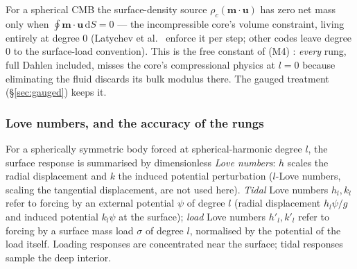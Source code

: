 \documentclass[11pt]{article}
\numberwithin{equation}{section}
\theoremstyle{remark}
\newcommand{\dS}{\,\mathrm{d}S}
\newcommand{\vu}{\mathbf{u}}
\newcommand{\vm}{\mathbf{m}}
\begin{document}
For a spherical CMB the surface-density source $\rho_c(\vm\cdot\vu)$ has
zero net mass only when $\oint\vm\cdot\vu\dS = 0$ --- the incompressible
core's volume constraint, living entirely at degree 0 (Latychev et al.\
\cite{Latychev2005} enforce it per step; other codes leave degree 0 to the
surface-load convention). This is the free constant of (M4) \cite{AW10}:
\emph{every} rung, full Dahlen included, misses the core's compressional
physics at $l=0$ because eliminating the fluid discards its bulk modulus
there. The gauged treatment (\S\ref{sec:gauged}) keeps it.

\subsubsection{Love numbers, and the accuracy of the rungs}

For a spherically symmetric body forced at spherical-harmonic degree $l$,
the surface response is summarised by dimensionless \emph{Love numbers}:
$h$ scales the radial displacement and $k$ the induced potential
perturbation ($l$-Love numbers, scaling the tangential displacement, are
not used here). \emph{Tidal} Love numbers $h_l, k_l$ refer to forcing by an
external potential $\psi$ of degree $l$ (radial displacement $h_l\psi/g$
and induced potential $k_l\psi$ at the surface); \emph{load} Love numbers
$h'_l, k'_l$ refer to forcing by a surface mass load $\sigma$ of degree
$l$, normalised by the potential of the load itself. Loading responses are
concentrated near the surface; tidal responses sample the deep interior.
\end{document}
